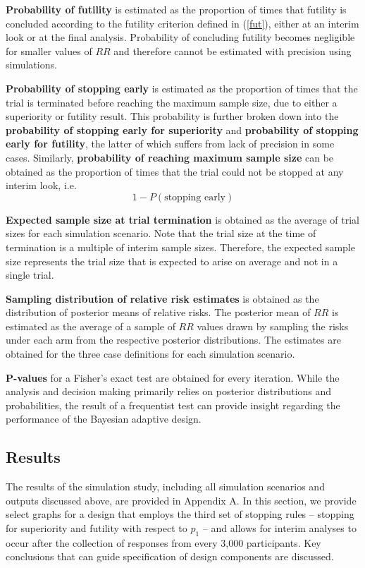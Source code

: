 \documentclass[12pt]{article}
\begin{document}
{\bf Probability of futility} is estimated as the proportion of times that futility is concluded according to the futility criterion defined in (\ref{fut}), either at an interim look or at the final analysis. Probability of concluding futility becomes negligible for smaller values of $RR$ and therefore cannot be estimated with precision using simulations.

{\bf Probability of stopping early} is estimated as the proportion of times that the trial is terminated before reaching the maximum sample size, due to either a superiority or futility result. This probability is further broken down into the {\bf probability of stopping early for superiority} and {\bf probability of stopping early for futility}, the latter of which suffers from lack of precision in some cases. Similarly, {\bf probability of reaching maximum sample size} can be obtained as the proportion of times that the trial could not be stopped at any interim look, i.e. 
$$1-P(\text{stopping early})$$

{\bf Expected sample size at trial termination} is obtained as the average of trial sizes for each simulation scenario. Note that the trial size at the time of termination is a multiple of interim sample sizes. Therefore, the expected sample size represents the trial size that is expected to arise on average and not in a single trial. 

{\bf Sampling distribution of relative risk estimates} is obtained as the distribution of posterior means of relative risks. The posterior mean of $RR$  is estimated as the average of a sample of $RR$ values drawn by sampling the risks under each arm from the respective posterior distributions. The estimates are obtained for the three case definitions for each simulation scenario.

{\bf P-values} for a Fisher's exact test are obtained for every iteration. While the analysis and decision making primarily relies on posterior distributions and probabilities, the result of a frequentist test can provide insight regarding the performance of the Bayesian adaptive design.


\subsection{Results}

The results of the simulation study, including all simulation scenarios and outputs discussed above, are provided in Appendix A. In this section, we provide select graphs for a design that employs the third set of stopping rules -- stopping for superiority and futility with respect to $p_1$ -- and allows for interim analyses to occur after the collection of responses from every 3,000 participants.  Key conclusions that can guide specification of design components are discussed. 
\end{document}
